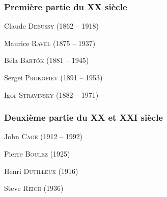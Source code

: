 \documentclass[11pt]{scrreprt}
\begin{document}
\subsubsection{Première partie du XX\ieme{} siècle}
\begin{description}
\item Claude \textsc{Debussy} (1862 -- 1918)
\item Maurice \textsc{Ravel} (1875 -- 1937)
\item Béla \textsc{Bartók} (1881 -- 1945)
\item Sergei \textsc{Prokofiev} (1891 -- 1953)
\item Igor \textsc{Stravinsky} (1882 -- 1971)
\end{description}

\subsubsection{Deuxième partie du XX\ieme{} et XXI\ieme{} siècle}
\begin{description}
\item John \textsc{Cage} (1912 -- 1992)
\item Pierre \textsc{Boulez} (1925)
\item Henri \textsc{Dutilleux} (1916)
\item Steve \textsc{Reich} (1936)
\end{description}


\printindex
\end{document}
